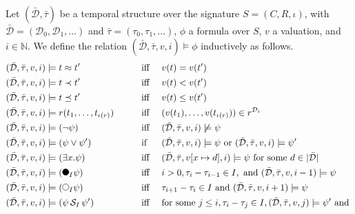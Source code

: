 \begin{definition}
    \label{def:mfotl-evaluation}
    Let $(\bar{\mathcal{D}}, \bar{\tau})$ be a temporal structure over the signature $S = (C,R,\iota)$, with $\bar{\mathcal{D}} = (\mathcal{D}_0,\mathcal{D}_1,\dots)$ and $\bar{\tau} = (\tau_0, \tau_1, \dots)$, $\phi$ a formula over $S$, $v$ a valuation, and $i \in \mathbb{N}$.
    We define the relation $(\bar{\mathcal{D}},\bar{\tau},v,i) \models \phi$ inductively as follows.
    \begin{alignat*}{3}
        &(\bar{\mathcal{D}},\bar{\tau},v,i) \models t \approx t'  
            &&\text{iff } && v(t) = v(t') \\
        &(\bar{\mathcal{D}},\bar{\tau},v,i) \models t \prec t'  
            &&\text{iff } && v(t) < v(t') \\
        &(\bar{\mathcal{D}},\bar{\tau},v,i) \models t \preceq t'  
            &&\text{iff } && v(t) \leq v(t') \\
        &(\bar{\mathcal{D}},\bar{\tau},v,i) \models r(t_1,\dots,t_{\iota(r)})  
            \qquad
            &&\text{iff } && (v(t_1), \dots, v(t_{\iota(r)})) \in r^{\mathcal{D}_i} \\
        &(\bar{\mathcal{D}},\bar{\tau},v,i) \models (\neg \psi) 
            &&\text{iff } && (\bar{\mathcal{D}},\bar{\tau},v,i) \not\models \psi \\
        &(\bar{\mathcal{D}},\bar{\tau},v,i) \models (\psi \lor \psi') 
            &&\text{if } && (\bar{\mathcal{D}},\bar{\tau},v,i) \models \psi 
            \text{ or } (\bar{\mathcal{D}},\bar{\tau},v,i) \models \psi' \\
        &(\bar{\mathcal{D}},\bar{\tau},v,i) \models (\exists x. \psi) 
            &&\text{iff } && (\bar{\mathcal{D}},\bar{\tau},v[x \mapsto d],i) \models \psi 
            \text{ for some } d \in |\bar{\mathcal{D}}| \\
        &(\bar{\mathcal{D}},\bar{\tau},v,i) \models (\Previous{I} \psi) 
            &&\text{iff } && i > 0, \tau_i - \tau_{i-1} \in I, \text{ and } (\bar{\mathcal{D}}, \bar{\tau}, v, i-1) \models \psi \\
        &(\bar{\mathcal{D}},\bar{\tau},v,i) \models (\Next{I} \psi)
            &&\text{iff } && \tau_{i+1} - \tau_i \in I \text{ and } (\bar{\mathcal{D}},\bar{\tau},v,i+1) \models \psi \\
        &(\bar{\mathcal{D}},\bar{\tau},v,i) \models (\psi \Since{I} \psi')
            &&\text{iff} && \text{for some } j \leq i, \tau_i - \tau_j \in I, (\bar{\mathcal{D}}, \bar{\tau}, v, j) \models \psi' \text{ and } \\

\end{alignat*}
\end{definition}
